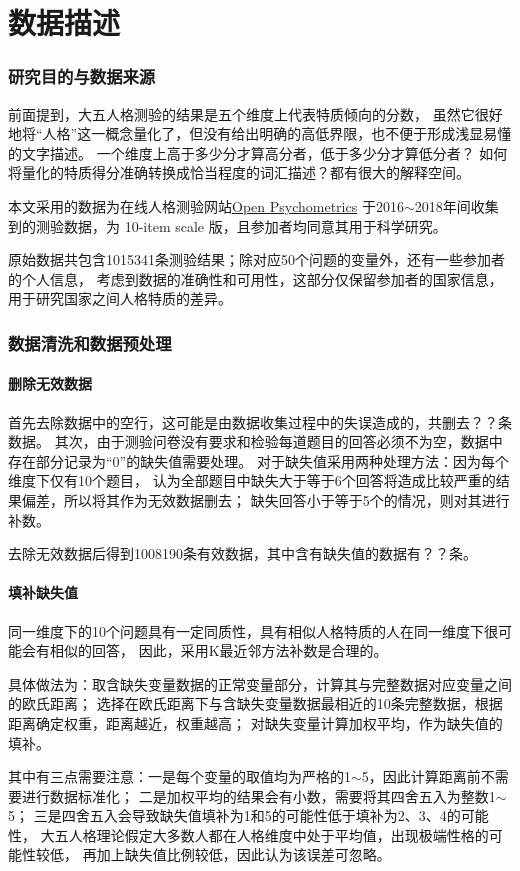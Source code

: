 \documentclass[UTF8]{ctexart}
\begin{document}
  \part{数据描述}
    \setcounter{section}{0}
    \section{研究目的与数据来源}
      前面提到，大五人格测验的结果是五个维度上代表特质倾向的分数，
      虽然它很好地将“人格”这一概念量化了，但没有给出明确的高低界限，也不便于形成浅显易懂的文字描述。
      一个维度上高于多少分才算高分者，低于多少分才算低分者？
      如何将量化的特质得分准确转换成恰当程度的词汇描述？都有很大的解释空间。\par
      本文采用的数据为在线人格测验网站\href{https://openpsychometrics.org}{Open Psychometrics}
      于2016$\sim$2018年间收集到的测验数据，为 10-item scale 版，且参加者均同意其用于科学研究。\par
      原始数据共包含1015341条测验结果；除对应50个问题的变量外，还有一些参加者的个人信息，
      考虑到数据的准确性和可用性，这部分仅保留参加者的国家信息，用于研究国家之间人格特质的差异。
    \section{数据清洗和数据预处理}
      \subsection*{删除无效数据}
        首先去除数据中的空行，这可能是由数据收集过程中的失误造成的，共删去？？条数据。
        其次，由于测验问卷没有要求和检验每道题目的回答必须不为空，数据中存在部分记录为“0”的缺失值需要处理。
        对于缺失值采用两种处理方法：因为每个维度下仅有10个题目，
        认为全部题目中缺失大于等于6个回答将造成比较严重的结果偏差，所以将其作为无效数据删去；
        缺失回答小于等于5个的情况，则对其进行补数。\par
        去除无效数据后得到1008190条有效数据，其中含有缺失值的数据有？？条。
      \subsection*{填补缺失值}
        同一维度下的10个问题具有一定同质性，具有相似人格特质的人在同一维度下很可能会有相似的回答，
        因此，采用K最近邻方法补数是合理的。\par
        具体做法为：取含缺失变量数据的正常变量部分，计算其与完整数据对应变量之间的欧氏距离；
        选择在欧氏距离下与含缺失变量数据最相近的10条完整数据，根据距离确定权重，距离越近，权重越高；
        对缺失变量计算加权平均，作为缺失值的填补。\par
        其中有三点需要注意：一是每个变量的取值均为严格的1$\sim$5，因此计算距离前不需要进行数据标准化；
        二是加权平均的结果会有小数，需要将其四舍五入为整数1$\sim$5；
        三是四舍五入会导致缺失值填补为1和5的可能性低于填补为2、3、4的可能性，
        大五人格理论假定大多数人都在人格维度中处于平均值，出现极端性格的可能性较低，
        再加上缺失值比例较低，因此认为该误差可忽略。
\end{document}
